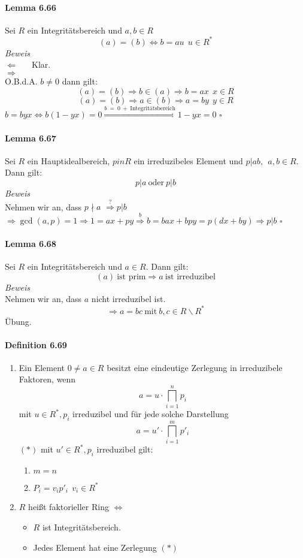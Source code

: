 \documentclass{scrartcl}
\begin{document}
\paragraph{Lemma 6.66}
Sei $R$ ein Integritätsbereich und $a,b \in R$
\[
  (a) = (b) \Leftrightarrow b = au ~~ u \in R^*
\]
\textit{Beweis} \\
\grqq $\Leftarrow$ \grqq ~~ Klar. \\
\grqq $\Rightarrow$ \grqq \\
O.B.d.A. $b \neq 0$ dann gilt:
\[
  (a) = (b) \Rightarrow b \in (a) \Rightarrow b = ax ~~ x \in R
\]
\[
  (a) = (b) \Rightarrow a \in (b) \Rightarrow a = by ~~ y \in R
\]
$b = byx \Leftrightarrow b(1 - yx) = 0 \overset{b~=~0~+
  ~\text{Integritätsbereich}}{\Rightarrow} 1 - yx = 0$
\hfill $\square$

\paragraph{Lemma 6.67}
Sei $R$ ein Hauptidealbereich, $p in R$ ein irreduzibeles Element und
$p|ab, ~~ a,b \in R$. Dann gilt:
\[
  p|a ~\text{oder}~ p|b
\]
\textit{Beweis} \\
Nehmen wir an, dass $p \nmid a$ $\overset{?}{\Rightarrow} p|b$ \\
$\Rightarrow \gcd(a, p) = 1 \Rightarrow 1 = ax + py
\overset{b}{\Rightarrow} b = bax + bpy = p(dx + by) \Rightarrow p|b$ \hfill $\square$

\paragraph{Lemma 6.68}
Sei $R$ ein Integritätsbereich und $a \in R$. Dann gilt:
\[
  (a) ~ \text{ist prim} \Rightarrow a ~ \text{ist irreduzibel}
\]
\textit{Beweis} \\
Nehmen wir an, dass $a$ nicht irreduzibel ist.
\[
  \Rightarrow a = bc ~ \text{mit} ~ b,c \in R \backslash R^*
\]
Übung.

\paragraph{Definition 6.69}
\begin{enumerate}
\item Ein Element $0 \neq a \in R$ besitzt eine eindeutige Zerlegung in
  irreduzibele Faktoren, wenn
  \[
    a = u \cdot \bigsqcap_{i = 1}^n p_i
  \]
  mit $u \in R^*, p_i$ irreduzibel und für jede solche Darstellung
  \[
    a = u' \cdot \bigsqcap_{i = 1}^m p'_i
  \] $(*)$
  mit $u' \in R^*, p_i$ irreduzibel gilt:
  \begin{enumerate}
  \item $m = n$
  \item $P_i = v_ip'_i ~~ v_i \in R^*$
  \end{enumerate}
\item $R$ heißt faktorieller Ring  $\Leftrightarrow$
  \begin{itemize}
    \item $R$ ist Integritätsbereich.
    \item Jedes Element hat eine Zerlegung $(*)$
  \end{itemize}
\end{enumerate}
\end{document}
